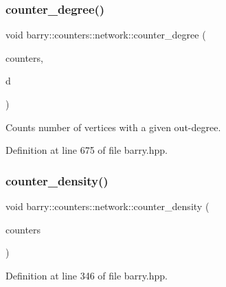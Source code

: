 \subsubsection{\texorpdfstring{counter\+\_\+degree()}{counter\_degree()}}
{\footnotesize\ttfamily void barry\+::counters\+::network\+::counter\+\_\+degree (\begin{DoxyParamCaption}\item[{\hyperlink{namespacebarry_1_1counters_1_1network_a3b3c590303d47840d1967372ae495d95}{Net\+Counter\+Vector} $\ast$}]{counters,  }\item[{std\+::vector$<$ \hyperlink{namespacebarry_a11dfc53ddb4672278319aa04f1e09a6c}{uint} $>$}]{d }\end{DoxyParamCaption})\hspace{0.3cm}{\ttfamily [inline]}}



Counts number of vertices with a given out-\/degree. 



Definition at line 675 of file barry.\+hpp.

\mbox{\label{namespacebarry_1_1counters_1_1network_a313ba439c81c589759cbbc613d12e80b}} 
\subsubsection{\texorpdfstring{counter\+\_\+density()}{counter\_density()}}
{\footnotesize\ttfamily void barry\+::counters\+::network\+::counter\+\_\+density (\begin{DoxyParamCaption}\item[{\hyperlink{namespacebarry_1_1counters_1_1network_a3b3c590303d47840d1967372ae495d95}{Net\+Counter\+Vector} $\ast$}]{counters }\end{DoxyParamCaption})\hspace{0.3cm}{\ttfamily [inline]}}



Definition at line 346 of file barry.\+hpp.

\mbox{\label{namespacebarry_1_1counters_1_1network_af8f024a17f6c518aef79c2cf670e49f5}} 
